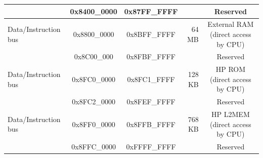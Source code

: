 \begin{ThreePartTable}
\begin{longtable}[c]{|p{3.5cm}|c|c|r|c| }
        \rowcolor{gray!25}  & 0x8400\_0000 & 0x87FF\_FFFF &         & Reserved      \\\hline
        {Data/Instruction bus} & 0x8800\_0000 & 0x8BFF\_FFFF & 64 MB  & External RAM (direct access by CPU) \\\hline
        \rowcolor{gray!25}  & 0x8C00\_000 & 0x8FBF\_FFFF &         & Reserved      \\\hline
        {Data/Instruction bus} & 0x8FC0\_0000 & 0x8FC1\_FFFF & 128 KB  & HP ROM (direct access by CPU)\\\hline
        \rowcolor{gray!25}  & 0x8FC2\_0000 & 0x8FEF\_FFFF &         & Reserved      \\\hline
        {Data/Instruction bus} & 0x8FF0\_0000 & 0x8FFB\_FFFF & 768 KB  & HP L2MEM (direct access by CPU)\\\hline
        \rowcolor{gray!25}  & 0x8FFC\_0000 & 0xFFFF\_FFFF &         & Reserved      \\\hline
\end{longtable}
\end{ThreePartTable}